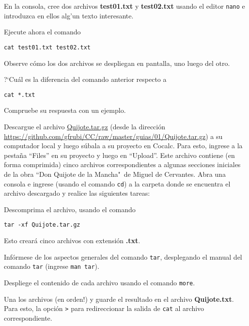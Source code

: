 \documentclass[11pt]{exam}
\begin{document}
\begin{questions}
\begin{parts}
\item En la consola, cree dos archivos \textbf{test01.txt} y \textbf{test02.txt} usando el editor \texttt{nano} e introduzca en ellos alg'un texto interesante.

\item Ejecute ahora el comando 

\begin{verbatim}
cat test01.txt test02.txt
\end{verbatim}

Observe cómo los dos archivos se despliegan en pantalla, uno luego del otro.

\item ?`Cuál es la diferencia del comando anterior respecto a 

\begin{verbatim}
cat *.txt
\end{verbatim}

Compruebe su respuesta con un ejemplo.
\end{parts}

\item Descargue el archivo \href{https://github.com/gfrubi/CC/raw/master/guias/01/Quijote.tar.gz}{Quijote.tar.gz} (desde la dirección \url{https://github.com/gfrubi/CC/raw/master/guias/01/Quijote.tar.gz}) a su computador local y luego súbala a su proyecto en Cocalc. Para esto, ingrese a la pestaña ``Files'' en su proyecto y luego en ``Upload''. Este archivo contiene (en forma comprimida) cinco archivos correspondientes a algunas secciones iniciales de la obra ``Don Quijote de la Mancha"\, de Miguel de Cervantes. Abra una consola e ingrese (usando el comando \texttt{cd}) a la carpeta donde se encuentra el archivo descargado y realice las siguientes tareas:
\begin{parts}
\item Descomprima el archivo, usando el comando 

\begin{verbatim}
tar -xf Quijote.tar.gz
\end{verbatim}

Esto creará cinco archivos con extensión \textbf{.txt}. 
\item Infórmese de los aspectos generales del comando \texttt{tar}, desplegando el manual del comando \texttt{tar} (ingrese \texttt{man tar}).
\item Despliege el contenido de cada archivo usando el comando \texttt{more}.
\item Una los archivos (en orden!) y guarde el resultado en el archivo \textbf{Quijote.txt}. Para esto, la opción \texttt{>} para redireccionar la salida de \texttt{cat} al archivo correspondiente.
\end{parts}


\end{questions}
\end{document}
